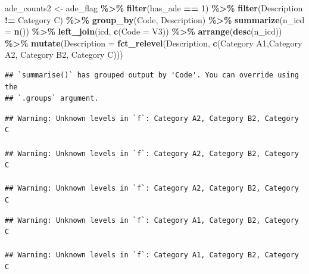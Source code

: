 \documentclass[preprint, 3p,
authoryear]{elsarticle} %
\newenvironment{Shaded}{\begin{snugshade}}{\end{snugshade}}
\newcommand{\DataTypeTok}[1]{\textcolor[rgb]{0.13,0.29,0.53}{#1}}
\newcommand{\DecValTok}[1]{\textcolor[rgb]{0.00,0.00,0.81}{#1}}
\newcommand{\KeywordTok}[1]{\textcolor[rgb]{0.13,0.29,0.53}{\textbf{#1}}}
\newcommand{\NormalTok}[1]{#1}
\newcommand{\OperatorTok}[1]{\textcolor[rgb]{0.81,0.36,0.00}{\textbf{#1}}}
\newcommand{\StringTok}[1]{\textcolor[rgb]{0.31,0.60,0.02}{#1}}
\begin{document}
\begin{Shaded}
\begin{Highlighting}[]
\NormalTok{ade\_counts2 \textless{}{-}}\StringTok{ }\NormalTok{ade\_flag }\OperatorTok{\%\textgreater{}\%}
\StringTok{  }\KeywordTok{filter}\NormalTok{(has\_ade }\OperatorTok{==}\StringTok{ }\DecValTok{1}\NormalTok{) }\OperatorTok{\%\textgreater{}\%}
\StringTok{  }\KeywordTok{filter}\NormalTok{(Description }\OperatorTok{!=}\StringTok{ \textquotesingle{}Category C\textquotesingle{}}\NormalTok{) }\OperatorTok{\%\textgreater{}\%}
\StringTok{  }\KeywordTok{group\_by}\NormalTok{(Code, Description) }\OperatorTok{\%\textgreater{}\%}
\StringTok{  }\KeywordTok{summarize}\NormalTok{(}\DataTypeTok{n\_icd =} \KeywordTok{n}\NormalTok{()) }\OperatorTok{\%\textgreater{}\%}
\StringTok{  }\KeywordTok{left\_join}\NormalTok{(icd, }\KeywordTok{c}\NormalTok{(}\StringTok{\textquotesingle{}Code\textquotesingle{}}\NormalTok{ =}\StringTok{ \textquotesingle{}V3\textquotesingle{}}\NormalTok{)) }\OperatorTok{\%\textgreater{}\%}
\StringTok{  }\KeywordTok{arrange}\NormalTok{(}\KeywordTok{desc}\NormalTok{(n\_icd)) }\OperatorTok{\%\textgreater{}\%}
\StringTok{  }\KeywordTok{mutate}\NormalTok{(}\DataTypeTok{Description =} \KeywordTok{fct\_relevel}\NormalTok{(Description, }\KeywordTok{c}\NormalTok{(}\StringTok{\textquotesingle{}Category A1\textquotesingle{}}\NormalTok{,}\StringTok{\textquotesingle{}Category A2\textquotesingle{}}\NormalTok{, }\StringTok{\textquotesingle{}Category B2\textquotesingle{}}\NormalTok{, }\StringTok{\textquotesingle{}Category C\textquotesingle{}}\NormalTok{)))}
\end{Highlighting}
\end{Shaded}

\begin{verbatim}
## `summarise()` has grouped output by 'Code'. You can override using the
## `.groups` argument.
\end{verbatim}

\begin{verbatim}
## Warning: Unknown levels in `f`: Category A2, Category B2, Category C

## Warning: Unknown levels in `f`: Category A2, Category B2, Category C

## Warning: Unknown levels in `f`: Category A2, Category B2, Category C
\end{verbatim}

\begin{verbatim}
## Warning: Unknown levels in `f`: Category A1, Category B2, Category C

## Warning: Unknown levels in `f`: Category A1, Category B2, Category C
\end{verbatim}
\end{document}
